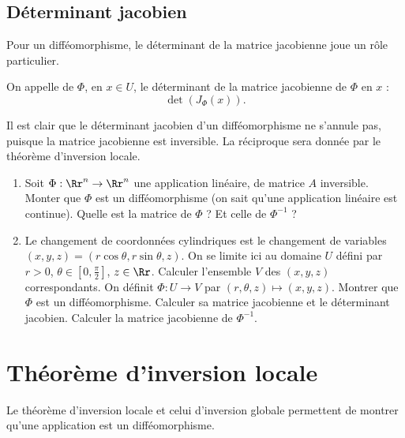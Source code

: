 \documentclass[11pt, class=report,crop=false]{standalone}
\begin{document}
\subsection{Déterminant jacobien}

Pour un difféomorphisme, le déterminant de la matrice jacobienne joue un rôle particulier.

On appelle  de $\Phi$, en $x \in U$, le déterminant de la matrice jacobienne de $\Phi$ en $x$ :
$$\det \left( J _{\Phi}(x) \right).$$

Il est clair que le déterminant jacobien d'un difféomorphisme ne s'annule pas, puisque la matrice jacobienne est inversible. La réciproque sera donnée par le théorème d'inversion locale.


\begin{miniexercices}
    \sauteligne
    \begin{enumerate}
        \item Soit $\Phi : \Rr^n \to \Rr^n$ une application linéaire, de matrice $A$ inversible. Monter que $\Phi$ est un difféomorphisme (on sait qu'une application linéaire est continue). Quelle est la matrice de $\Phi$ ? Et celle de $\Phi^{-1}$ ?
        
        \item Le changement de coordonnées cylindriques est le changement de variables $(x,y,z)=(r\cos\theta,r\sin\theta,z)$. On se limite ici au domaine $U$ défini par $r>0$, $\theta \in [0,\frac\pi2]$, $z\in\Rr$. Calculer l'ensemble $V$ des $(x,y,z)$ correspondants. On définit $\Phi : U \to V$ par $(r,\theta,z) \mapsto (x,y,z)$. Montrer que $\Phi$ est un difféomorphisme. Calculer sa matrice jacobienne et le déterminant jacobien. Calculer la matrice jacobienne de $\Phi^{-1}$.
    \end{enumerate}
\end{miniexercices}



\section{Théorème d'inversion locale}

Le théorème d'inversion locale et celui d'inversion globale permettent de montrer qu'une application est un difféomorphisme.

\end{document}
